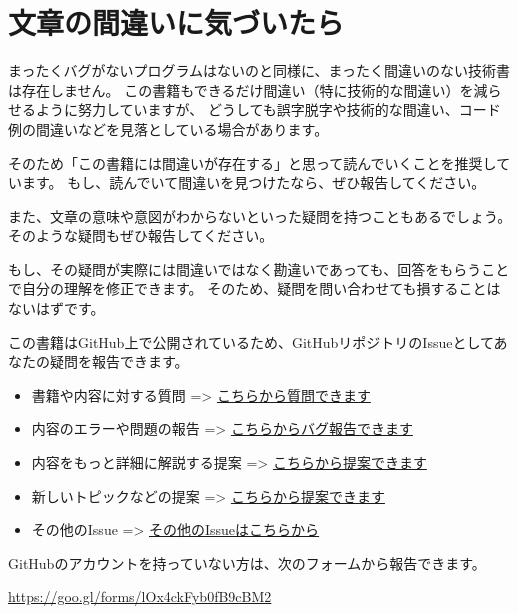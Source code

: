 \hypertarget{how-to-report-mistake}{%
\chapter*{文章の間違いに気づいたら}\label{how-to-report-mistake}}

まったくバグがないプログラムはないのと同様に、まったく間違いのない技術書は存在しません。
この書籍もできるだけ間違い（特に技術的な間違い）を減らせるように努力していますが、
どうしても誤字脱字や技術的な間違い、コード例の間違いなどを見落としている場合があります。

そのため「この書籍には間違いが存在する」と思って読んでいくことを推奨しています。
もし、読んでいて間違いを見つけたなら、ぜひ報告してください。

また、文章の意味や意図がわからないといった疑問を持つこともあるでしょう。
そのような疑問もぜひ報告してください。

もし、その疑問が実際には間違いではなく勘違いであっても、回答をもらうことで自分の理解を修正できます。
そのため、疑問を問い合わせても損することはないはずです。

この書籍はGitHub上で公開されているため、GitHubリポジトリのIssueとしてあなたの疑問を報告できます。

\begin{itemize}
\item
  書籍や内容に対する質問 =\textgreater{}
  \href{https://github.com/asciidwango/js-primer/issues/new?template=question.md}{こちらから質問できます}
\item
  内容のエラーや問題の報告 =\textgreater{}
  \href{https://github.com/asciidwango/js-primer/issues/new?template=bug_report.md}{こちらからバグ報告できます}
\item
  内容をもっと詳細に解説する提案 =\textgreater{}
  \href{https://github.com/asciidwango/js-primer/issues/new?template=feature_request.md}{こちらから提案できます}
\item
  新しいトピックなどの提案 =\textgreater{}
  \href{https://github.com/asciidwango/js-primer/issues/new?template=feature_request.md}{こちらから提案できます}
\item
  その他のIssue =\textgreater{}
  \href{https://github.com/asciidwango/js-primer/issues/new?template=other.md}{その他のIssueはこちらから}
\end{itemize}

GitHubのアカウントを持っていない方は、次のフォームから報告できます。

\url{https://goo.gl/forms/lOx4ckFyb0fB9cBM2}


